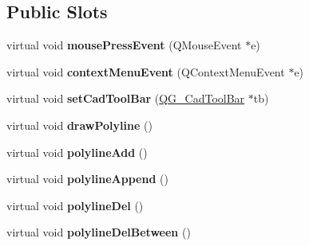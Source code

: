 \subsection*{Public Slots}
\begin{DoxyCompactItemize}
\item 
\hypertarget{classQG__CadToolBarPolylines_ada1275a6b0c33d53ca92e453b6c11330}{virtual void {\bfseries mouse\-Press\-Event} (Q\-Mouse\-Event $\ast$e)}\label{classQG__CadToolBarPolylines_ada1275a6b0c33d53ca92e453b6c11330}

\item 
\hypertarget{classQG__CadToolBarPolylines_a043fed38c3bb89ce0fa5898dd894f6e3}{virtual void {\bfseries context\-Menu\-Event} (Q\-Context\-Menu\-Event $\ast$e)}\label{classQG__CadToolBarPolylines_a043fed38c3bb89ce0fa5898dd894f6e3}

\item 
\hypertarget{classQG__CadToolBarPolylines_a90a30a24d7a520bd4912bc09b6231363}{virtual void {\bfseries set\-Cad\-Tool\-Bar} (\hyperlink{classQG__CadToolBar}{Q\-G\-\_\-\-Cad\-Tool\-Bar} $\ast$tb)}\label{classQG__CadToolBarPolylines_a90a30a24d7a520bd4912bc09b6231363}

\item 
\hypertarget{classQG__CadToolBarPolylines_a628b7fa8b5cd035a16e251d75b76d841}{virtual void {\bfseries draw\-Polyline} ()}\label{classQG__CadToolBarPolylines_a628b7fa8b5cd035a16e251d75b76d841}

\item 
\hypertarget{classQG__CadToolBarPolylines_ac8ae68b9c17e5911062a4031bdfc250c}{virtual void {\bfseries polyline\-Add} ()}\label{classQG__CadToolBarPolylines_ac8ae68b9c17e5911062a4031bdfc250c}

\item 
\hypertarget{classQG__CadToolBarPolylines_a11b93762c4f91dcdade21fc76a22ae5f}{virtual void {\bfseries polyline\-Append} ()}\label{classQG__CadToolBarPolylines_a11b93762c4f91dcdade21fc76a22ae5f}

\item 
\hypertarget{classQG__CadToolBarPolylines_a4a5fda6e3a8a68bad7dd29949afadd29}{virtual void {\bfseries polyline\-Del} ()}\label{classQG__CadToolBarPolylines_a4a5fda6e3a8a68bad7dd29949afadd29}

\item 
\hypertarget{classQG__CadToolBarPolylines_ae3ff8d794cf5c7952c6ef4eecdfafa0c}{virtual void {\bfseries polyline\-Del\-Between} ()}\label{classQG__CadToolBarPolylines_ae3ff8d794cf5c7952c6ef4eecdfafa0c}


\end{DoxyCompactItemize}
